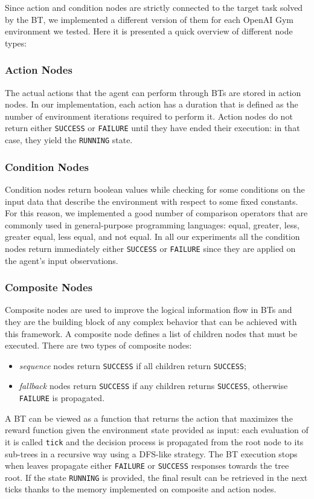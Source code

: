 Since action and condition nodes are strictly connected to the target task solved by the BT, we implemented a different version of them for each OpenAI Gym environment we tested. Here it is presented a quick overview of different node types:

\subsubsection{Action Nodes}
The actual actions that the agent can perform through BTs are stored in action nodes.
In our implementation, each action has a duration that is defined as the number of environment iterations required to perform it. Action nodes do not return either \texttt{SUCCESS} or \texttt{FAILURE} until they have ended their execution: in that case, they yield the \texttt{RUNNING} state.

\subsubsection{Condition Nodes}
Condition nodes return boolean values while checking for some conditions on the input data that describe the environment with respect to some fixed constants.
For this reason, we implemented a good number of comparison operators that are commonly used in general-purpose programming languages: equal, greater, less, greater equal, less equal, and not equal. In all our experiments all the condition nodes return immediately either \texttt{SUCCESS} or \texttt{FAILURE} since they are applied on the agent's input observations.

\subsubsection{Composite Nodes}
Composite nodes are used to improve the logical information flow in BTs and they are the building block of any complex behavior that can be achieved with this framework. A composite node defines a list of children nodes that must be executed. There are two types of composite nodes:
\begin{itemize}
    \item \textit{sequence} nodes return \texttt{SUCCESS} if all children return \texttt{SUCCESS};
    \item \textit{fallback} nodes return \texttt{SUCCESS} if any children returns \texttt{SUCCESS}, otherwise \texttt{FAILURE} is propagated.
\end{itemize}
A BT can be viewed as a function that returns the action that maximizes the reward function given the environment state provided as input: each evaluation of it is called \texttt{tick} and the decision process is propagated from the root node to its sub-trees in a recursive way using a DFS-like strategy. The BT execution stops when leaves propagate either \texttt{FAILURE} or \texttt{SUCCESS} responses towards the tree root. If the state \texttt{RUNNING} is provided, the final result can be retrieved in the next ticks thanks to the memory implemented on composite and action nodes. 
